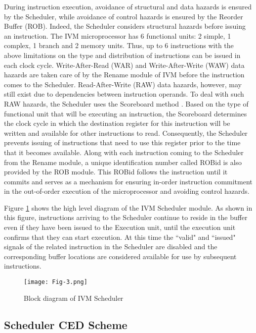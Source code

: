 \documentclass[12pt]{yalephd}
\begin{document}
During instruction execution, avoidance of structural and data hazards is ensured by the Scheduler, while avoidance of control hazards is ensured by the Reorder Buffer (ROB). Indeed, the Scheduler considers structural hazards before issuing an instruction. The IVM microprocessor has 6 functional units: 2 simple, 1 complex, 1 branch and 2 memory units. Thus, up to 6 instructions with the above limitations on the type and distribution of instructions can be issued in each clock cycle. Write-After-Read (WAR) and Write-After-Write (WAW) data hazards are taken care of by the Rename module of IVM before the instruction comes to the Scheduler. Read-After-Write (RAW) data hazards, however, may still exist due to dependencies between instruction operands. To deal with such RAW hazards, the Scheduler uses the Scoreboard method \cite{hennessy2011computer}. Based on the type of functional unit that will be executing an instruction, the Scoreboard determines the clock cycle in which the destination register for this instruction will be written and available for other instructions to read. Consequently, the Scheduler prevents issuing of instructions that need to use this register prior to the time that it becomes available. Along with each instruction coming to the Scheduler from the Rename module, a unique identification number called ROBid is also provided by the ROB module. This ROBid follows the instruction until it commits and serves as a mechanism for ensuring in-order instruction commitment in the out-of-order execution of the microprocessor and avoiding control hazards.

Figure \ref{sC3Scheduler} shows the high level diagram of the IVM Scheduler module. As shown in this figure, instructions arriving to the Scheduler continue to reside in the buffer even if they have been issued to the Execution unit, until the execution unit confirms that they can start execution. At this time the ``valid" and ``issued" signals of the related instruction in the Scheduler are disabled and the corresponding buffer locations are considered available for use by subsequent instructions.

\begin{figure}[!ht]
\centering
\texttt{[image: Fig-3.png]}
\caption{Block diagram of IVM Scheduler}\label{sC3Scheduler}
\end{figure}

\subsection{Scheduler CED Scheme}\label{sC3sCED}
\end{document}
